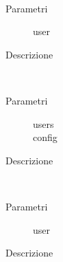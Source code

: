 \begin{description}
\begin{mldescription}
    \hfill \\
   \begin{description}
    \item[Parametri]
     \begin{description}
      \item[user]
     \end{description}
    \item[Descrizione]
   \end{description}
   
    \hfill \\
   \begin{description}
    \item[Parametri]
     \begin{description}
      \item[users]
      \item[config]
     \end{description}
    \item[Descrizione]
   \end{description}
   
    \hfill \\
   \begin{description}
    \item[Parametri]
     \begin{description}
      \item[user]
     \end{description}
    \item[Descrizione]
   \end{description}
   
   
   
 \end{mldescription}
 
 
\end{description}

